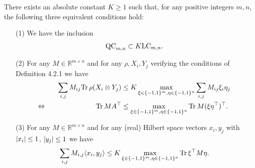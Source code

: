 	\begin{theo}
		There exists an absolute constant $K\geq 1$ such that, for any positive integers $m,n$, the following three equivalent conditions hold:
		\begin{itemize}
			\item[(1)] We have the inclusion 
				\begin{equation}
					\textup{QC}_{m,n} \subset K\textup{LC}_{m,n}.
				\end{equation}
			\item[(2)] For any $M\in\mathbb{R}^{m\times n}$ and for any $\rho,X_i,Y_j$ verifying the conditions of Definition %
			4.2.1
			 we have
				\begin{align}
					\sum_{i,j} M_{ij} \textup{Tr} \, {\rho(X_i\otimes Y_j)}  &\leq K \max_{\xi\in\{-1,1\}^m,\eta\in\{-1,1\}^n} \sum_{i,j} M_{ij}\xi_i\eta_j \\
					\Leftrightarrow \hspace{2.5cm} \textup{Tr} \, {MA^\top}  &\leq \max_{\xi\in\{-1,1\}^m,\eta\in\{-1,1\}^n} \textup{Tr} \, {M(\xi\eta^\top)^\top} .
				\end{align}
				\item[(3)] For any $M\in\mathbb{R}^{m\times n}$ and for any (real) Hilbert space vectors $x_i,y_j$ with ${\left|{x_i}\right|}\leq 1$, ${\left|{y_j}\right|}\leq 1$ we have
					\begin{equation}
						\sum_{i,j} M_{i,j}\langle{x_i},{y_j}\rangle \leq K \max_{\xi\in\{-1,1\}^m,\eta\in\{-1,1\}^n} \textup{Tr} \, {\xi^\top M \eta} . \label{eq:G_ineq}
					\end{equation}
		\end{itemize}
	\end{theo}
